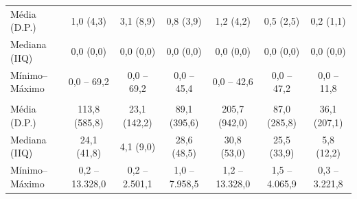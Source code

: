 \begin{table}[!h]
{\begin{tabular}[t]{lcccccc}
\hspace{1em}Média (D.P.) & 1,0 (4,3) & 3,1 (8,9) & 0,8 (3,9) & 1,2 (4,2) & 0,5 (2,5) & 0,2 (1,1)\\
\hspace{1em}Mediana (IIQ) & 0,0 (0,0) & 0,0 (0,0) & 0,0 (0,0) & 0,0 (0,0) & 0,0 (0,0) & 0,0 (0,0)\\
\hspace{1em}Mínimo–Máximo & 0,0 – 69,2 & 0,0 – 69,2 & 0,0 – 45,4 & 0,0 – 42,6 & 0,0 – 47,2 & 0,0 – 11,8\\
\addlinespace[0.3em]
\multicolumn{7}{l}{\textbf{Densidade demográfica (hab/km²)}}\\
\hspace{1em}Média (D.P.) & 113,8 (585,8) & 23,1 (142,2) & 89,1 (395,6) & 205,7 (942,0) & 87,0 (285,8) & 36,1 (207,1)\\
\hspace{1em}Mediana (IIQ) & 24,1 (41,8) & 4,1 (9,0) & 28,6 (48,5) & 30,8 (53,0) & 25,5 (33,9) & 5,8 (12,2)\\
\hspace{1em}Mínimo–Máximo & 0,2 – 13.328,0 & 0,2 – 2.501,1 & 1,0 – 7.958,5 & 1,2 – 13.328,0 & 1,5 – 4.065,9 & 0,3 – 3.221,8\\
\bottomrule
\end{tabular}}
\end{table}

